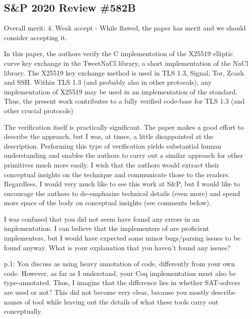 \subsection{S\&P 2020 Review \#582B}

Overall merit: 4. Weak accept - While flawed, the paper has merit and we should
consider accepting it.


\begin{center}
\end{center}

In this paper, the authors verify the C implementation of the X25519 elliptic
curve key exchange in the TweetNaCl library, a short implementation of the NaCl
library. The X25519 key exchange method is used in TLS 1.3, Signal, Tor, Zcash
and SSH. Within TLS 1.3 (and probably also in other protocols), any implementation
of X25519 may be used in an implementation of the standard. Thus, the present
work contributes to a fully verified code-base for TLS 1.3 (and other crucial
protocols)

The verification itself is practically significant. The paper makes a good
effort to describe the approach, but I was, at times, a little disappointed at
the description. Performing this type of verification yields substantial human
understanding and enables the authors to carry out a similar approach for other
primitives much more easily. I wish that the authors would extract their conceptual
insights on the technique and communicate those to the readers. Regardless, I
would very much like to see this work at S\&P, but I would like to encourage the
authors to de-emphasize technical details (even more) and spend more space of
the body on conceptual insights (see comments below).


\begin{center}
\end{center}

I was confused that you did not seem have found any errors in an implementation.
I can believe that the implementers of \cite{BGJ+15} are proficient implementers,
but I would have expected some minor bugs/parsing issues to be found anyway.
What is your explanation that you haven't found any issues?

p.1: You discuss \cite{Ber06} as using heavy annotation of code, differently from your
own code. However, as far as I understand, your Coq implementation must also be
type-annotated. Thus, I imagine that the difference lies in whether SAT-solvers
are used or not? This did not become very clear, because you mostly describe
names of tool while leaving out the details of what these tools carry out
conceptually.

